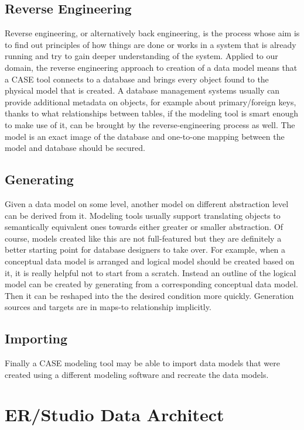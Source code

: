 \subsection{Reverse Engineering}
\label{data_model_reverse_engineering}
Reverse engineering, or alternatively back engineering, is the process whose aim is to find out principles of how things are done or works in a system that is already running and try to gain deeper understanding of the system.
Applied to our domain, the reverse engineering approach to creation of a data model means that a CASE tool connects to a database and brings every object found to the physical model that is created. A database management systems usually can provide additional metadata on objects, for example about primary/foreign keys, thanks to what relationships between tables, if the modeling tool is smart enough to make use of it, can be brought by the reverse-engineering process as well.
The model is an exact image of the database and one-to-one mapping between the model and database should be secured.

\subsection{Generating}
\label{generating}
Given a data model on some level, another model on different abstraction level can be derived from it. Modeling tools usually support translating objects to semantically equivalent ones towards either greater or smaller abstraction. Of course, models created like this are not full-featured but they are definitely a better starting point for database designers to take over. 
For example, when a conceptual data model is arranged and logical model should be created based on it, it is really helpful not to start from a scratch. Instead an outline of the logical model can be created by generating from a corresponding conceptual data model. 
Then it can be reshaped into the the desired condition more quickly. 
Generation sources and targets are in maps-to relationship implicitly.

\subsection{Importing}
Finally a CASE modeling tool may be able to import data models that were created using a different modeling software and recreate the data models.

\section{ER/Studio Data Architect}

